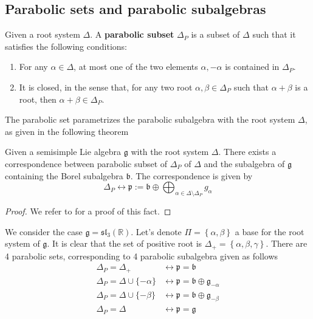 \subsection{Parabolic sets and parabolic subalgebras}
\begin{definition}
    Given a root system $\Delta$. A \textbf{parabolic subset} $\Delta_P$ is a subset of $\Delta$ such that
    it satisfies the following conditions:
    \begin{enumerate}
        \item For any $\alpha \in \Delta$, at most one of the two elements $\alpha, - \alpha$ is contained in $\Delta_P$.
        \item It is closed, in the sense that, for any two root $\alpha,\beta \in \Delta_P$ such that $\alpha+\beta$ is a root, then $\alpha+\beta \in \Delta_P$.
    \end{enumerate}
\end{definition}
The parabolic set parametrizes the parabolic subalgebra with the root system $\Delta$, as given in the following theorem
\begin{theorem}
    Given a semisimple Lie algebra $\mathfrak{g}$ with the root system $\Delta$. There exists a correspondence between
    parabolic subset of $\Delta_P$ of $\Delta$ and the subalgebra of $\mathfrak{g}$ containing the
    Borel subalgebra $\mathfrak{b}$. The correspondence is given by
    \[ \Delta_P \longleftrightarrow \mathfrak{p}:= \mathfrak{b}\oplus \bigoplus_{\alpha \in \Delta \setminus \Delta_P} g_{\alpha}\]
\end{theorem}
\begin{proof}
    We refer to \cite{} for a proof of this fact.
\end{proof}
\begin{example}
    We consider the case $\mathfrak{g} = \mathfrak{sl}_3(\mathbb{R})$. Let's denote
    $\Pi = \left\lbrace \alpha,\beta\right\rbrace$ a base for the root system of $\mathfrak{g}$. It is clear that
    the set of positive root is $\Delta_+=\left\lbrace \alpha,\beta,\gamma \right\rbrace$. There are
    4 parabolic sets, corresponding to 4 parabolic subalgebra given as follows
    \begin{align*}
        \Delta_P = \Delta_+                 & \longleftrightarrow \mathfrak{p} = \mathfrak{b}                               \\
        \Delta_{P} =\Delta \cup \{-\alpha\} & \longleftrightarrow \mathfrak{p} = \mathfrak{b} \oplus \mathfrak{g}_{-\alpha} \\
        \Delta_{P}= \Delta \cup \{-\beta\}  & \longleftrightarrow \mathfrak{p} = \mathfrak{b} \oplus \mathfrak{g}_{-\beta}  \\
        \Delta_P= \Delta                    & \longleftrightarrow \mathfrak{p} = \mathfrak{g}
    \end{align*}
\end{example}

